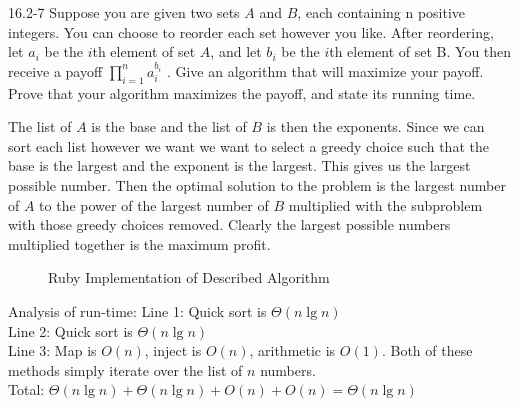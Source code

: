 \begin{problem}{16.2-7}
  Suppose you are given two sets $A$ and $B$, each containing n positive integers. You can choose to reorder each set
however you like. After reordering, let $a_i$ be the $i$th element of set $A$, and let $b_i$ be the $i$th element of set
B. You then receive a payoff $\displaystyle\prod\limits_{i = 1}^n a_i^{b_i}$ . Give an algorithm that will maximize your
   payoff. Prove that your algorithm maximizes the payoff, and state its running time.
   \begin{solution}
     The list of $A$ is the base and the list of $B$ is then the exponents. Since we can sort each list however we want
     we want to select a greedy choice such that the base is the largest and the exponent is the largest. This gives us
     the largest possible number. Then the optimal solution to the problem is the largest number of $A$ to the power of
     the largest number of $B$ multiplied with the subproblem with those greedy choices removed. Clearly the largest
     possible numbers multiplied together is the maximum profit.
     \begin{figure}[H]
       \centering
       \caption{Ruby Implementation of Described Algorithm}
       
     \end{figure}
     \noindent Analysis of run-time:
     \br
     Line 1: Quick sort is $\Theta(n \lg n)$ \\
     Line 2: Quick sort is $\Theta(n \lg n)$ \\
     Line 3: Map is $O(n)$, inject is $O(n)$, arithmetic is $O(1)$. Both of these methods simply iterate over the list  of $n$ numbers. \\
     Total: $\Theta(n \lg n) + \Theta(n \lg n) + O(n) + O(n) = \Theta(n \lg n)$
   \end{solution}
\end{problem}

